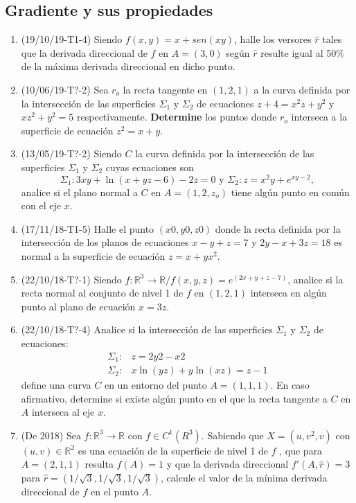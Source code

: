 \documentclass[12pt,a4paper]{article}
\renewcommand{\b}[1]{\textbf{#1}}
\newcommand{\R}{\mathbb{R}}
\begin{document}
\subsection{Gradiente y sus propiedades}
\begin{enumerate}
	\item (19/10/19-T1-4) Siendo $ f ( x , y ) = x + sen ( x y )  $, halle los versores $ \hat{r} $ tales que la derivada direccional de $ f $ en $ A = ( 3 , 0 ) $ según $\hat{r}$ resulte igual al 50\% de la máxima derivada direccional en dicho punto.
	
	\item (10/06/19-T?-2) Sea $ r_o $ la recta tangente en $ ( 1 , 2 , 1 ) $ a la curva definida por la intersección de las superficies $ \Sigma_1 $ y $ \Sigma_2 $ de ecuaciones $ z + 4 = x^2 z + y^2 $ y $ x z^2 + y^2 = 5 $ respectivamente. \b{Determine} los puntos donde $ r_o $ interseca a la superficie de ecuación $ z^2 = x + y  $.
	
	\item (13/05/19-T?-2) Siendo $ C $ la curva definida por la intersección de las superficies  $ \Sigma_1 $ y $ \Sigma_2 $ cuyas ecuaciones son
	\[\Sigma_1 : 3 x y + \ln( x + y z - 6 ) - 2 z = 0 \text{ y } \Sigma_2 : z = x^2 y + e^{	x y - 2},\]
	analice si el plano normal a $ C $ en $ A = ( 1 , 2 , z_o ) $ tiene algún punto en común con el eje $ x  $.
	
	\item (17/11/18-T1-5) Halle el punto $ ( x 0 , y 0 , z 0 ) $ donde la recta definida por la intersección de los planos de ecuaciones $ x - y + z = 7 $ y $ 2 y - x + 3 z = 18 $ es normal a la superficie de ecuación $ z = x + y x^2  $.
	
	\item (22/10/18-T?-1) Siendo $ f : \R^3\rightarrow\R / f ( x , y , z ) = e^{(2x+y+z-7)}$, analice si la recta normal al conjunto de nivel 1 de $ f $ en $ ( 1 , 2 , 1 ) $ interseca en algún punto al plano de ecuación $ x = 3 z  $.
	
	\item (22/10/18-T?-4) Analice si la intersección de las superficies $\Sigma_1$ y $ \Sigma_2 $ de ecuaciones:
	\begin{align}
		\Sigma_1 :& z = 2 y 2 - x 2\\
		\Sigma_2 :& x \ln( y z ) + y \ln( x z ) = z - 1
	\end{align}
	define una curva $ C $ en un entorno del punto $ A = ( 1 , 1 , 1 )  $. En caso afirmativo, determine si existe algún punto en el que la recta tangente a $ C $ en $ A $ interseca al eje $ x  $.
	
	\item (De 2018) Sea $ f : \R^3\rightarrow \R $ con $ f \in C^1 (R^3)$. Sabiendo que $ X = (u , v^2 , v) $ con $ (u, v) \in \R^2 $ es una ecuación de la superficie de nivel 1 de $ f $ , que para $ A = (2, 1, 1) $ resulta $ f(A) = 1 $ y que la derivada direccional $ f'(A , \hat{r}) = 3 $ para $ \hat{r}=(1/\sqrt{ 3}, 1/\sqrt{ 3}, 1/\sqrt{ 3}) $, calcule el valor de la mínima derivada direccional de $ f $ en el punto $ A $.
	
\end{enumerate}
\end{document}
